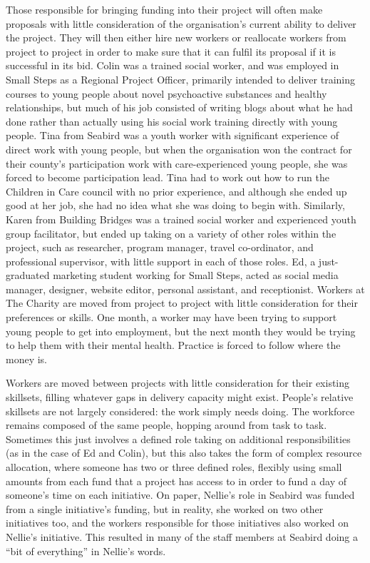 Those responsible for bringing funding into their project will often make proposals with little consideration of the organisation's current ability to deliver the project. They will then either hire new workers or reallocate workers from project to project in order to make sure that it can fulfil its proposal if it is successful in its bid. Colin was a trained social worker, and was employed in Small Steps as a Regional Project Officer, primarily intended to deliver training courses to young people about novel psychoactive substances and healthy relationships, but much of his job consisted of writing blogs about what he had done rather than actually using his social work training directly with young people. Tina from Seabird was a youth worker with significant experience of direct work with young people, but when the organisation won the contract for their county’s participation work with care-experienced young people, she was forced to become participation lead. Tina had to work out how to run the Children in Care council with no prior experience, and although she ended up good at her job, she had no idea what she was doing to begin with. Similarly, Karen from Building Bridges was a trained social worker and experienced youth group facilitator, but ended up taking on a variety of other roles within the project, such as researcher, program manager, travel co-ordinator, and professional supervisor, with little support in each of those roles. Ed, a just-graduated marketing student working for Small Steps, acted as social media manager, designer, website editor, personal assistant, and receptionist. Workers at The Charity are moved from project to project with little consideration for their preferences or skills. One month, a worker may have been trying to support young people to get into employment, but the next month they would be  trying to help them with their mental health. Practice is forced to follow where the money is.

Workers are moved between projects with little consideration for their existing skillsets, filling whatever gaps in delivery capacity might exist. People's relative skillsets are not largely considered: the work simply needs doing. The workforce remains composed of the same people, hopping around from task to task. Sometimes this just involves a defined role taking on additional responsibilities (as in the case of Ed and Colin), but this also takes the form of complex resource allocation, where someone has two or three defined roles, flexibly using small amounts from each fund that a project has access to in order to fund a day of someone’s time on each initiative. On paper, Nellie's role in Seabird was funded from a single initiative’s funding, but in reality, she worked on two other initiatives too, and the workers responsible for those initiatives also worked on Nellie’s initiative. This resulted in many of the staff members at Seabird doing a “bit of everything” in Nellie’s words. 

